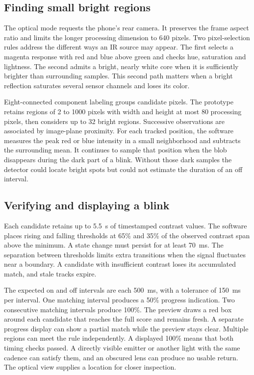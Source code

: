 \documentclass[conference]{IEEEtran}
\begin{document}
\subsection{Finding small bright regions}
The optical mode requests the phone's rear camera. It preserves the frame aspect ratio and limits the longer processing dimension to 640 pixels. Two pixel-selection rules address the different ways an IR source may appear. The first selects a magenta response with red and blue above green and checks hue, saturation and lightness. The second admits a bright, nearly white core when it is sufficiently brighter than surrounding samples. This second path matters when a bright reflection saturates several sensor channels and loses its color.

Eight-connected component labeling groups candidate pixels. The prototype retains regions of 2 to 1000 pixels with width and height at most 80 processing pixels, then considers up to 32 bright regions. Successive observations are associated by image-plane proximity. For each tracked position, the software measures the peak red or blue intensity in a small neighborhood and subtracts the surrounding mean. It continues to sample that position when the blob disappears during the dark part of a blink. Without those dark samples the detector could locate bright spots but could not estimate the duration of an off interval.

\subsection{Verifying and displaying a blink}
Each candidate retains up to 5.5~s of timestamped contrast values. The software places rising and falling thresholds at 65\% and 35\% of the observed contrast span above the minimum. A state change must persist for at least 70~ms. The separation between thresholds limits extra transitions when the signal fluctuates near a boundary. A candidate with insufficient contrast loses its accumulated match, and stale tracks expire.

The expected on and off intervals are each 500~ms, with a tolerance of 150~ms per interval. One matching interval produces a 50\% progress indication. Two consecutive matching intervals produce 100\%. The preview draws a red box around each candidate that reaches the full score and remains fresh. A separate progress display can show a partial match while the preview stays clear. Multiple regions can meet the rule independently. A displayed 100\% means that both timing checks passed. A directly visible emitter or another light with the same cadence can satisfy them, and an obscured lens can produce no usable return. The optical view supplies a location for closer inspection.
\end{document}
